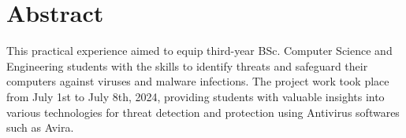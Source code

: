 \section*{\centering Abstract}

This practical experience aimed to equip third-year BSc. Computer Science and Engineering students with the skills to identify threats and safeguard their computers against viruses and malware infections. The project work took place from July 1st to July 8th, 2024, providing students with valuable insights into various technologies for threat detection and protection using Antivirus softwares such as Avira.